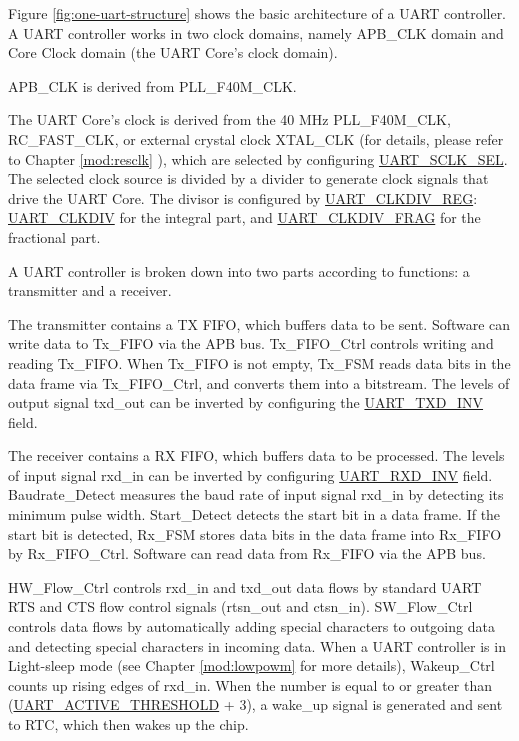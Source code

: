 \documentclass[main\_\_EN.tex]{subfiles}
\begin{document}
Figure \ref{fig:one-uart-structure} shows the basic architecture of a UART controller. A UART controller works in two clock domains, namely APB\_CLK domain and Core Clock domain (the UART Core's clock domain).

APB\_CLK is derived from PLL\_F40M\_CLK.

The UART Core's clock is derived from the 40 MHz PLL\_F40M\_CLK, RC\_FAST\_CLK, or external crystal clock XTAL\_CLK (for details, please refer to Chapter \ref{mod:resclk} \textit{}), which are selected by configuring \hyperref[fielddesc:UARTSCLKSEL]{UART\_SCLK\_SEL}. The selected clock source is divided by a divider to generate clock signals that drive the UART
Core. The divisor is configured by \hyperref[regdesc:UARTCLKDIVREG]{UART\_CLKDIV\_REG}: \hyperref[fielddesc:UARTCLKDIV]{UART\_CLKDIV} for the integral part, and \hyperref[fielddesc:UARTCLKDIVFRAG]{UART\_CLKDIV\_FRAG} for the fractional part.


A UART controller is broken down into two parts according to functions: a transmitter and a receiver.

The transmitter contains a TX FIFO, which buffers data to be sent. Software can write data to Tx\_FIFO via the APB bus. Tx\_FIFO\_Ctrl controls writing and reading Tx\_FIFO. When Tx\_FIFO is not empty, Tx\_FSM reads data bits in the data frame via Tx\_FIFO\_Ctrl, and converts them into a bitstream. The levels of output signal txd\_out can be inverted by configuring the \hyperref[fielddesc:UARTTXDINV]{UART\_TXD\_INV} field.

The receiver contains a RX FIFO, which buffers data to be processed. The levels of input signal rxd\_in can be inverted by configuring \hyperref[fielddesc:UARTRXDINV]{UART\_RXD\_INV} field. Baudrate\_Detect measures the baud rate of input signal rxd\_in by detecting its minimum pulse width. Start\_Detect detects the start bit in a data frame. If the start bit is detected, Rx\_FSM stores data bits in the data frame into Rx\_FIFO by Rx\_FIFO\_Ctrl. Software can read data from Rx\_FIFO via the APB bus.

HW\_Flow\_Ctrl controls rxd\_in and txd\_out data flows by standard UART RTS and CTS flow control signals (rtsn\_out and ctsn\_in). SW\_Flow\_Ctrl controls data flows by automatically adding special characters to outgoing data and detecting special characters in incoming data. When a UART controller is in Light-sleep mode (see Chapter \ref{mod:lowpowm} \textit{} for more details), Wakeup\_Ctrl counts up rising edges of rxd\_in. When the number is equal to or greater than (\hyperref[fielddesc:UARTACTIVETHRESHOLD]{UART\_ACTIVE\_THRESHOLD} + 3), a wake\_up signal is generated and sent to RTC, which then wakes up the \chipname{} chip.
\end{document}
